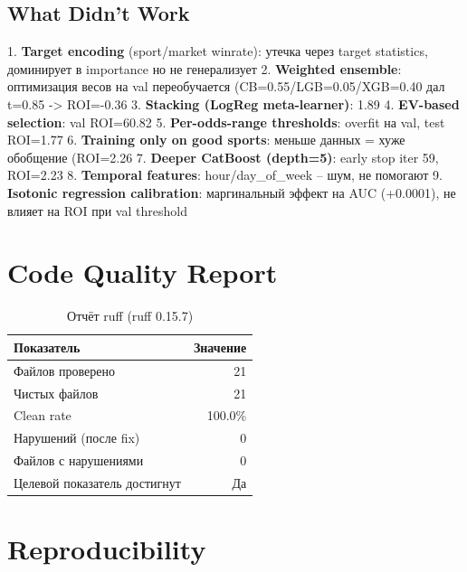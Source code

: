 \documentclass[12pt,a4paper]{article}
\begin{document}
\subsection{What Didn't Work}

1. \textbf{Target encoding} (sport/market winrate): утечка через target statistics, доминирует в importance но не генерализует
2. \textbf{Weighted ensemble}: оптимизация весов на val переобучается (CB=0.55/LGB=0.05/XGB=0.40 дал t=0.85 -> ROI=-0.36%
3. \textbf{Stacking (LogReg meta-learner)}: 1.89%
4. \textbf{EV-based selection}: val ROI=60.82%
5. \textbf{Per-odds-range thresholds}: overfit на val, test ROI=1.77%
6. \textbf{Training only on good sports}: меньше данных = хуже обобщение (ROI=2.26%
7. \textbf{Deeper CatBoost (depth=5)}: early stop iter 59, ROI=2.23%
8. \textbf{Temporal features}: hour/day_of_week -- шум, не помогают
9. \textbf{Isotonic regression calibration}: маргинальный эффект на AUC (+0.0001), не влияет на ROI при val threshold








\section{Code Quality Report}

\begin{table}[H]
\centering
\caption{Отчёт ruff (ruff 0.15.7)}
\begin{tabular}{lr}
\toprule
Показатель & Значение \\
\midrule
Файлов проверено & 21 \\
Чистых файлов & 21 \\
Clean rate & \textcolor{passcolor}{100.0\%} \\
Нарушений (после fix) & \textcolor{passcolor}{0} \\
Файлов с нарушениями & 0 \\
Целевой показатель достигнут & \textcolor{passcolor}{Да} \\
\bottomrule
\end{tabular}
\end{table}





\section{Reproducibility}
\end{document}
